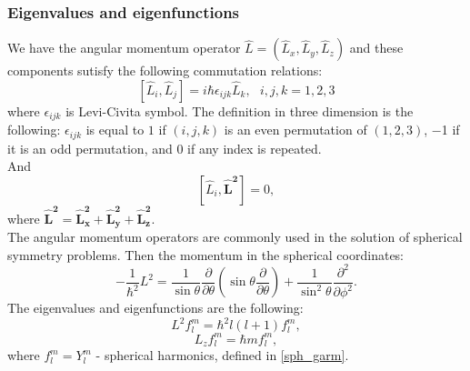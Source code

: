 \documentclass[a4paper, 12pt]{article}
\begin{document}
\subsubsection{Eigenvalues and eigenfunctions}
We have the angular momentum operator $\hat L = (\hat L_x,\hat L_y, \hat L_z)$ and these components sutisfy the following commutation relations:
\begin{equation}\label{comm_L}
	[\hat L_i, \hat L_j] =i \hbar \epsilon_{ijk}  \hat L_k, ~~~i, j, k =1,2,3
\end{equation}
where $\epsilon_{ijk}$ is Levi-Civita symbol. The definition in three dimension is the following:  $\epsilon_{ijk}$ is equal to $1$ if $(i, j, k)$ is an even permutation of $(1, 2, 3)$,  $-$1 if it is an odd permutation, and  $0$ if any index is repeated.\\
And 
$$[\hat L_i, \boldsymbol{\hat L^2}] = 0, $$
where $\mathbf{\hat L^2 = \hat L_x^2+\hat L_y^2+\hat L_z^2} .$\\
The angular momentum operators are commonly used in the solution of spherical symmetry problems. Then the momentum in the spherical coordinates: 
$$-\frac{1}{\hbar^2}L^2=\frac{1}{\sin \theta}\frac{\partial}{\partial \theta}(\sin \theta \frac{\partial}{\partial \theta})+\frac{1}{\sin^2 \theta}\frac{\partial^2}{\partial \phi^2}.$$
The eigenvalues and eigenfunctions are the following:
$$L^2 f_l^m = \hbar^2l(l+1) f_l^m,$$
$$L_z f_l^m = \hbar m f_l^m,$$
where $f_l^m = Y_l^m$ - spherical harmonics, defined in \eqref{sph_garm}.
\end{document}
